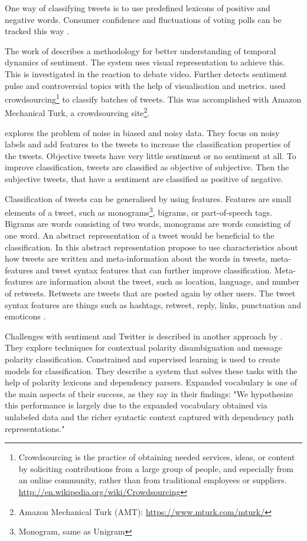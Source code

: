 One way of classifying tweets is to use predefined lexicons of positive and
negative words. Consumer confidence and fluctuations of voting polls can be
tracked this way \cite[]{connor2010}.

The work of \cite[]{diakopoulos2010} describes a methodology for better
understanding of temporal dynamics of sentiment. 
The system uses visual representation to achieve this. 
This is investigated in the reaction to debate video.
	Further \cite[]{diakopoulos2010} detects sentiment pulse and controversial
topics with the help of visualisation and metrics. 
	\cite[]{diakopoulos2010} used crowdsourcing\footnote{Crowdsourcing is the
practice of obtaining needed services, ideas, or content by soliciting
contributions from a large group of people, and especially from an online
community, rather than from traditional employees or suppliers.
\url{http://en.wikipedia.org/wiki/Crowdsourcing}} to classify batches of tweets.
This was accomplished with Amazon Mechanical Turk, a crowdsourcing
site\footnote{Amazon Mechanical Turk (AMT): \url{https://www.mturk.com/mturk/}}.

\cite[]{barbosa10} explores the problem of noise in biased and noisy data. 
They focus on noisy labels and add features to the tweets to increase the
classification properties of the tweets. Objective tweets have very little
sentiment or no sentiment at all. To improve classification, tweets are
classified as objective of subjective. Then the subjective tweets, that have a
sentiment are classified as positive of negative. 

Classification of tweets can be generalised by using features. Features are
small elements of a tweet, such as monograms\footnote{Monogram, same as
Unigram}, bigrams, or part-of-speech tags. Bigrams are words consisting of two
words, monograms are words consisting of one word. An abstract representation of
a tweet would be beneficial to the classification. In this abstract
representation \cite[]{barbosa10} propose to use characteristics about how
tweets are written and meta-information about the words in tweets, meta-features and tweet syntax features that can further improve classification.
Meta-features are information about the tweet, such as location, language, and
number of retweets. Retweets are tweets that are posted again by other users.
The tweet syntax features are things such as hashtags, retweet, reply, links,
punctuation and emoticons \cite[]{barbosa10}. 

Challenges with sentiment and Twitter is described in another approach by 
\cite[]{becker13}. They explore techniques for contextual polarity
disambiguation and message polarity classification. Constrained and supervised
learning is used to create models for classification. They describe a system
that solves these tasks with the help of polarity lexicons and dependency
parsers. Expanded vocabulary is one of the main aspects of their success, as
they say in their findings: "We hypothesize this performance is largely due to
the expanded vocabulary obtained via unlabeled data and the richer syntactic
context captured with dependency path representations." \cite[]{becker13}

